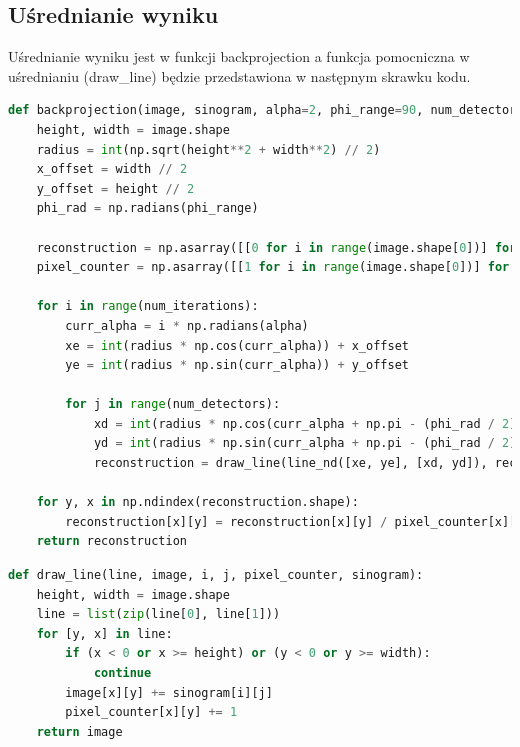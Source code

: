 \documentclass[a4paper,11pt]{article}
\begin{document}
  \subsection{Uśrednianie wyniku}
  Uśrednianie wyniku jest w funkcji backprojection a funkcja pomocniczna w uśrednianiu (draw\_line) będzie przedstawiona w następnym skrawku kodu.
  \begin{lstlisting}[language=Python, caption=Backprojection, basicstyle=\tiny]
def backprojection(image, sinogram, alpha=2, phi_range=90, num_detectors=180, num_iterations=90):
    height, width = image.shape
    radius = int(np.sqrt(height**2 + width**2) // 2)
    x_offset = width // 2
    y_offset = height // 2
    phi_rad = np.radians(phi_range)

    reconstruction = np.asarray([[0 for i in range(image.shape[0])] for j in range(image.shape[1])])
    pixel_counter = np.asarray([[1 for i in range(image.shape[0])] for j in range(image.shape[1])])

    for i in range(num_iterations):
        curr_alpha = i * np.radians(alpha)
        xe = int(radius * np.cos(curr_alpha)) + x_offset
        ye = int(radius * np.sin(curr_alpha)) + y_offset

        for j in range(num_detectors):
            xd = int(radius * np.cos(curr_alpha + np.pi - (phi_rad / 2) + j * phi_rad/(num_detectors-1))) + x_offset
            yd = int(radius * np.sin(curr_alpha + np.pi - (phi_rad / 2) + j * phi_rad/(num_detectors-1))) + y_offset
            reconstruction = draw_line(line_nd([xe, ye], [xd, yd]), reconstruction, i, j, pixel_counter, sinogram)

    for y, x in np.ndindex(reconstruction.shape):
        reconstruction[x][y] = reconstruction[x][y] / pixel_counter[x][y]
    return reconstruction
  \end{lstlisting}

  \begin{lstlisting}[language=Python, caption=Draw line, basicstyle=\tiny]
def draw_line(line, image, i, j, pixel_counter, sinogram):
    height, width = image.shape
    line = list(zip(line[0], line[1]))
    for [y, x] in line:
        if (x < 0 or x >= height) or (y < 0 or y >= width):
            continue
        image[x][y] += sinogram[i][j]
        pixel_counter[x][y] += 1
    return image
  \end{lstlisting}
\end{document}
